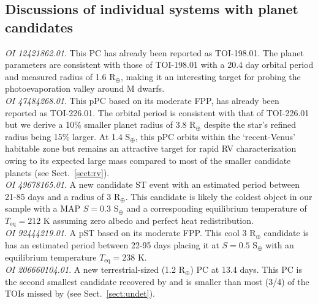 \subsection{Discussions of individual systems with planet candidates} \label{sect:indiv}
\emph{OI 12421862.01}. This PC has already been reported as TOI-198.01. The \pipeline{} planet parameters
are consistent with those of TOI-198.01 with a 20.4 day orbital period and measured
radius of 1.6 R$_{\oplus}$, making it an interesting target for probing the photoevaporation valley
around M dwarfs. \\

\emph{OI 47484268.01}. This pPC based on its moderate FPP, has already been reported as TOI-226.01.
The \pipeline{} orbital period is consistent with that of TOI-226.01 but we derive a 10\% smaller
planet radius of 3.8 R$_{\oplus}$ despite the star's refined radius being 15\% larger. At 1.4 S$_{\oplus}$,
this pPC orbits within the `recent-Venus' habitable zone but remains an attractive target for rapid RV
characterization owing to its expected large mass compared to most of the smaller candidate planets (see
Sect.~\ref{sect:rv}). \\

\emph{OI 49678165.01}. A new candidate ST event with an estimated period between 21-85 days and a radius of
3 R$_{\oplus}$. This candidate is likely the coldest object in our sample with a MAP $S=0.3$ S$_{\oplus}$
and a corresponding equilibrium temperature of $T_{\text{eq}}= 212$ K assuming zero albedo and perfect heat redistribution. \\

\emph{OI 92444219.01}. A pST based on its moderate FPP. This cool 3 R$_{\oplus}$ candidate is
has an estimated period between 22-95 days placing it at $S=0.5$ S$_{\oplus}$ with
an equilibrium temperature $T_{\text{eq}}= 238$ K. \\


\emph{OI 206660104.01}. A new terrestrial-sized (1.2 R$_{\oplus}$) PC at 13.4 days. This PC is the
second smallest candidate recovered by \pipeline{} and is smaller than most (3/4) of the TOIs missed by
\pipeline{} (see Sect.~\ref{sect:undet}). \\

